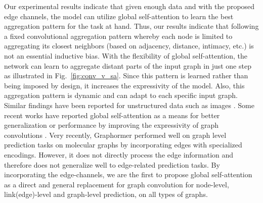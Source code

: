\documentclass[sigconf,authorversion]{acmart}
\begin{document}
Our experimental results indicate that given enough data and with the proposed edge channels, the model can utilize global self-attention to learn the best aggregation pattern for the task at hand. Thus, our results indicate that following a fixed convolutional aggregation pattern whereby each node is limited to aggregating its closest neighbors (based on adjacency, distance, intimacy, etc.) is not an essential inductive bias. With the flexibility of global self-attention, the network can learn to aggregate distant parts of the input graph in just one step as illustrated in Fig.~\ref{fig:conv_v_sa}. Since this pattern is learned rather than being imposed by design, it increases the expressivity of the model. Also, this aggregation pattern is dynamic and can adapt to each specific input graph. Similar findings have been reported for unstructured data such as images \citep{dosovitskiy2020image, cordonnier2019relationship, ramachandran2019stand}. Some recent works have reported global self-attention as a means for better generalization or performance by improving the expressivity of graph convolutions \citep{puny2020global,wang2021global}. Very recently, Graphormer \citep{ying2021transformers} performed well on graph level prediction tasks on molecular graphs by incorporating edges with specialized encodings. However, it does not directly process the edge information and therefore does not generalize well to edge-related prediction tasks. By incorporating the edge-channels, we are the first to propose global self-attention as a direct and general replacement for graph convolution for node-level, link(edge)-level and graph-level prediction, on all types of graphs.
\end{document}
